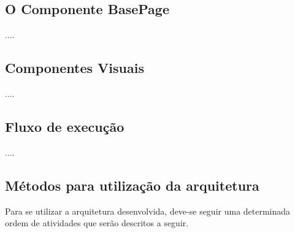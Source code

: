 \subsection{O Componente BasePage}\label{sec:solucao-desenvolvida}
....


\subsection{Componentes Visuais}\label{sec:solucao-desenvolvida}
....


\subsection{Fluxo de execução}\label{sec:solucao-desenvolvida}
....


\subsection{Métodos para utilização da arquitetura}
Para se utilizar a arquitetura desenvolvida, deve-se seguir uma determinada ordem de atividades que serão descritos a seguir.
